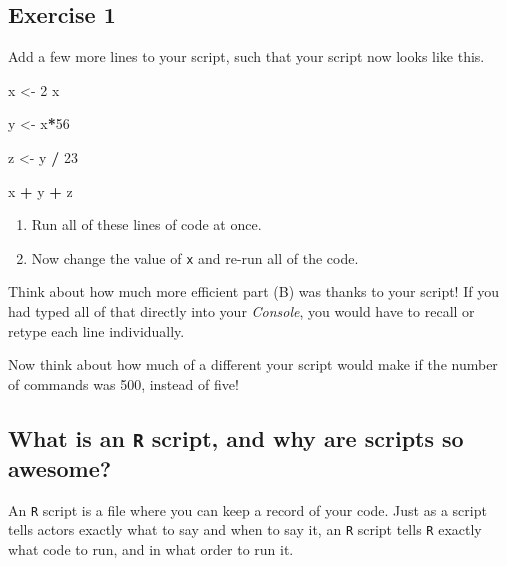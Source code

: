\documentclass[
]{book}
\newenvironment{Shaded}{\begin{snugshade}}{\end{snugshade}}
\newcommand{\DecValTok}[1]{\textcolor[rgb]{0.00,0.00,0.81}{#1}}
\newcommand{\NormalTok}[1]{#1}
\newcommand{\OperatorTok}[1]{\textcolor[rgb]{0.81,0.36,0.00}{\textbf{#1}}}
\newcommand{\StringTok}[1]{\textcolor[rgb]{0.31,0.60,0.02}{#1}}
\providecommand{\tightlist}{%
  \setlength{\itemsep}{0pt}\setlength{\parskip}{0pt}}
\begin{document}
\hypertarget{exercise-1-1}{%
\subsection*{Exercise 1}\label{exercise-1-1}}

Add a few more lines to your script, such that your script now looks like this.

\begin{Shaded}
\begin{Highlighting}[]
\NormalTok{x <-}\StringTok{ }\DecValTok{2} 
\NormalTok{x}

\NormalTok{y <-}\StringTok{ }\NormalTok{x}\OperatorTok{*}\DecValTok{56}

\NormalTok{z <-}\StringTok{ }\NormalTok{y }\OperatorTok{/}\StringTok{ }\DecValTok{23}
 
\NormalTok{x }\OperatorTok{+}\StringTok{ }\NormalTok{y }\OperatorTok{+}\StringTok{ }\NormalTok{z}
\end{Highlighting}
\end{Shaded}

\begin{enumerate}
\def\labelenumi{(\Alph{enumi})}
\tightlist
\item
  Run all of these lines of code at once.\\
\item
  Now change the value of \texttt{x} and re-run all of the code.
\end{enumerate}

Think about how much more efficient part (B) was thanks to your script! If you had typed all of that directly into your \emph{Console}, you would have to recall or retype each line individually.

Now think about how much of a different your script would make if the number of commands was 500, instead of five!

\hypertarget{what-is-an-r-script-and-why-are-scripts-so-awesome}{%
\subsection*{\texorpdfstring{What is an \texttt{R} script, and why are scripts so awesome?}{What is an R script, and why are scripts so awesome?}}\label{what-is-an-r-script-and-why-are-scripts-so-awesome}}

An \texttt{R} script is a file where you can keep a record of your code. Just as a script tells actors exactly what to say and when to say it, an \texttt{R} script tells \texttt{R} exactly what code to run, and in what order to run it.
\end{document}
